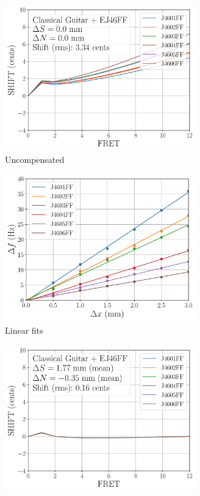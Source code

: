  \begin{figure}
   \centering
   \begin{subfigure}[b]{0.46\textwidth}
    \centering
    \includegraphics[width=3.25in]{figures/shift_classicalguitar_ej46ff_null}
    \caption{Uncompensated}
    \label{fig:shift_classicalguitar_ej46ff_null}
   \end{subfigure}
   \hspace{0.25in}
   \begin{subfigure}[b]{0.46\textwidth}
    \centering
    \includegraphics[width=3.25in]{figures/fit_ej46ff}
    \caption{Linear fits}
    \label{fig:fit_ej46ff}
   \end{subfigure}
   \par\vspace{0.25in}
   \begin{subfigure}[b]{0.46\textwidth}
    \centering
    \includegraphics[width=3.25in]{figures/shift_classicalguitar_ej46ff_full}

\end{subfigure}
\end{figure}
